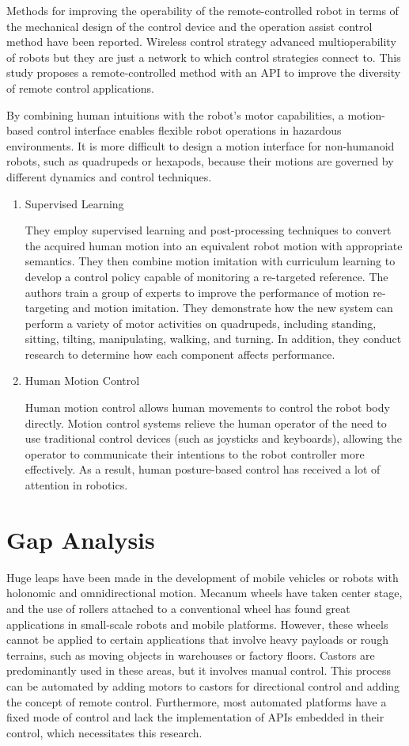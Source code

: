Methods for improving the operability of the remote-controlled robot in terms of the mechanical design of the control device and the operation assist control method have been reported. Wireless control strategy advanced multioperability of robots \cite{almali_wireless_2015} but they are just a network to which control strategies connect to. This study proposes a remote-controlled method with an \ac{API} to improve the diversity of remote control applications. 

By combining human intuitions with the robot's motor capabilities, a motion-based control interface enables flexible robot operations in hazardous environments. It is more difficult to design a motion interface for non-humanoid robots, such as quadrupeds or hexapods, because their motions are governed by different dynamics and control techniques.
\begin{enumerate}
    \item Supervised Learning
    \par
    They employ supervised learning and post-processing techniques to convert the acquired human motion into an equivalent robot motion with appropriate semantics. They then combine motion imitation with curriculum learning to develop a control policy capable of monitoring a re-targeted reference. The authors train a group of experts to improve the performance of motion re-targeting and motion imitation. They demonstrate how the new system can perform a variety of motor activities on quadrupeds, including standing, sitting, tilting, manipulating, walking, and turning. In addition, they conduct research to determine how each component affects performance.
    \item Human Motion Control
    \par
    Human motion control allows human movements to control the robot body directly. Motion control systems relieve the human operator of the need to use traditional control devices (such as joysticks and keyboards), allowing the operator to communicate their intentions to the robot controller more effectively. As a result, human posture-based control has received a lot of attention in robotics.
\end{enumerate}

\section{Gap Analysis}
Huge leaps have been made in the development of mobile vehicles or robots with holonomic and omnidirectional motion.
Mecanum wheels have taken center stage, and the use of rollers attached to a conventional wheel has found great applications in small-scale robots and mobile platforms.
However, these wheels cannot be applied to certain applications that involve heavy payloads or rough terrains, such as moving objects in warehouses or factory floors.
Castors are predominantly used in these areas, but it involves manual control.
This process can be automated by adding motors to castors for directional control and adding the concept of remote control. Furthermore, most automated platforms have a fixed mode of control and lack the implementation of \ac{API}s embedded in their control, which necessitates this research.